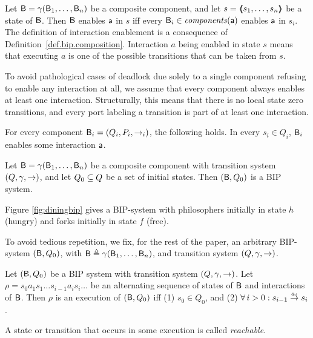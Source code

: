 Let $\B = \gamma(\B_1,\dots,\B_n)$ be a composite component, and let $s =
\tpl{s_1,\ldots,s_n}$ be a state of $\B$.  Then $\B$ enables $\act$ in $s$
iff every $\B_i \in \cmps{\act}$ enables $\act$ in $s_i$.  
\ed
%
The definition of  interaction enablement is a consequence of 
Definition~\ref{def.bip.composition}.
Interaction $a$ being enabled in state $s$ means that executing
$a$ is one of the possible transitions that can be taken from $s$.

To avoid pathological cases of deadlock due solely to a single component refusing to enable any interaction at all, 
we assume that every component always enables at least one interaction.
Structurally, this means that there is no local state zero transitions, and every port labeling a transition is 
part of at least one interaction. 

 \label{def.bip.local-enablement}
For every component  $\B_i = (Q_i,P_i,\goesto_i)$, the following holds. In every $s_i \in Q_i$, $\B_i$ enables some
interaction $\act$.
\ed



\label{def.bip.system} Let $\B = \gamma(\B_1,\dots,\B_n)$ be a composite component with transition system $(Q,\gamma,
\goestog)$, and let $Q_0 \sub Q$ be a set of initial states. Then $(\B,Q_0)$ is a BIP system.  \ed

\noindent
Figure \ref{fig:diningbip} gives a BIP-system with philosophers initially in state $h$ (hungry) and forks initially in
state $f$ (free).

To avoid tedious repetition, we fix, for the rest of the paper, an arbitrary BIP-system $(\B, Q_0)$, with
$\B \df \gamma(\B_1,\dots,\B_n)$, and transition system $(Q,\gamma, \goestog)$.





\bd[Execution]\label{def.bip.execution} Let $(\B, Q_0)$ be a BIP system
with transition system $(Q,\gamma, \goestog)$.  
Let $\rho = s_0 a_1 s_1 \ldots s_{i-1} a_i s_i \ldots$ be an alternating sequence of
states of $\B$ and interactions of $\B$. Then $\rho$ is an execution of
$(\B, Q_0)$ iff (1) $s_0 \in Q_0$, and (2) $\fa i > 0: s_{i-1} \goesto[a_i] s_i$.  \ed



\label{def.bip.reachable}
A state or transition that occurs in some execution is called \emph{reachable}.

